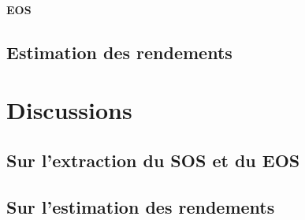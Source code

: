 \paragraph{EOS}

\subsection{Estimation des rendements}
  
\section{Discussions}

\subsection{Sur l'extraction du SOS et du EOS}

\subsection{Sur l'estimation des rendements}
